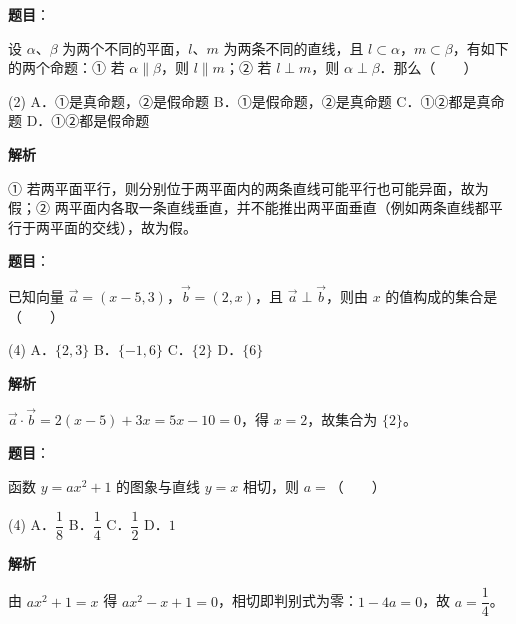 \begin{answer}

\textbf{题目}：

设 $\alpha$、$\beta$ 为两个不同的平面，$l$、$m$ 为两条不同的直线，且 $l \subset \alpha$，$m \subset \beta$，有如下的两个命题：① 若 $\alpha \parallel \beta$，则 $l \parallel m$；② 若 $l \perp m$，则 $\alpha \perp \beta$．那么\mbox{（　　）}

\begin{gkopts}(2)
\task A．①是真命题，②是假命题
\task B．①是假命题，②是真命题
\task C．①②都是真命题
\task D．①②都是假命题
\end{gkopts}

\textbf{解析}

① 若两平面平行，则分别位于两平面内的两条直线可能平行也可能异面，故为假；② 两平面内各取一条直线垂直，并不能推出两平面垂直（例如两条直线都平行于两平面的交线），故为假。


\end{answer}
\begin{answer}

\textbf{题目}：

已知向量 $\vec{a} = (x - 5, 3)$，$\vec{b} = (2, x)$，且 $\vec{a} \perp \vec{b}$，则由 $x$ 的值构成的集合是\mbox{（　　）}

\begin{gkopts}(4)
\task A．$\{2, 3\}$
\task B．$\{-1, 6\}$
\task C．$\{2\}$
\task D．$\{6\}$
\end{gkopts}

\textbf{解析}

$\vec{a}\cdot\vec{b} = 2(x - 5) + 3x = 5x - 10 = 0$，得 $x = 2$，故集合为 $\{2\}$。


\end{answer}
\begin{answer}

\textbf{题目}：

函数 $y = ax^2 + 1$ 的图象与直线 $y = x$ 相切，则 $a =$\mbox{（　　）}

\begin{gkopts}(4)
\task A．$\dfrac{1}{8}$
\task B．$\dfrac{1}{4}$
\task C．$\dfrac{1}{2}$
\task D．$1$
\end{gkopts}

\textbf{解析}

由 $ax^2 + 1 = x$ 得 $ax^2 - x + 1 = 0$，相切即判别式为零：$1 - 4a = 0$，故 $a = \dfrac{1}{4}$。


\end{answer}
